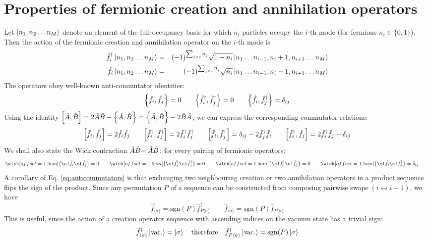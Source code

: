 \documentclass[12pt]{article}
\newcommand{\sgn}{\text{sgn}}
\newcommand{\seq}[1]{\langle #1\rangle}
\newcommand{\hc}{^\dagger}
\newcommand{\normord}[1]{:\mathrel{\mspace{2mu}#1\mspace{2mu}}:}
\begin{document}
	\section{Properties of fermionic creation and annihilation operators}
	
	Let $\ket{n_1,n_2\dots n_M}$ denote an element of the full-occupancy basis for which $n_i$ particles occupy the $i$-th mode (for fermions $n_i\in\{0,1\}$). Then the action of the fermionic creation and annihilation operator on the $i$-th mode is \cite[Eq. 3.47]{fermionic_definition}
	\begin{eqnarray}
	\hat{f}\hc_i\ket{n_1,n_2\dots n_M}&=&(-1)^{\sum_{j<i}n_j}\sqrt{1-n_i}\ket{n_1\dots n_{i-1}, n_i + 1, n_{i+1}\dots n_M}\\
	\hat{f}_i\ket{n_1,n_2\dots n_M}&=&(-1)^{\sum_{j<i}n_j}\sqrt{n_i}\ket{n_1\dots n_{i-1}, n_i - 1, n_{i+1}\dots n_M}
	\end{eqnarray}
	The operators obey well-known anti-commutator identities:
	\begin{equation}\label{eq:anticommutators}
	\acomm{\hat{f}_i}{\hat{f}_j}=0\qquad\acomm{\hat{f}\hc_i}{\hat{f}\hc_j}=0\qquad\acomm{\hat{f}_i}{\hat{f}\hc_j}=\delta_{ij}
	\end{equation}
	Using the identity $\comm{\hat{A}}{\hat{B}}=2\hat{A}\hat{B}-\acomm{\hat{A}}{\hat{B}}=\acomm{\hat{A}}{\hat{B}}-2\hat{B}\hat{A}$, we can express the corresponding commutator relations:
	\begin{equation}\label{eq:commutators}
	\comm{\hat{f}_i}{\hat{f}_j}=2\hat{f}_i\hat{f}_j\qquad\comm{\hat{f}\hc_i}{\hat{f}\hc_j}=2\hat{f}\hc_i\hat{f}\hc_j\qquad\comm{\hat{f}_i}{\hat{f}\hc_j}=\delta_{ij}-2\hat{f}\hc_j\hat{f}_i\qquad \comm{\hat{f}\hc_i}{\hat{f}_j}=2\hat{f}\hc_i\hat{f}_j-\delta_{ij}
	\end{equation}
	We shall also state the Wick contraction $\hat{A}\hat{B}-\mkern-7mu\normord{\hat{A}\hat{B}}$ for every pairing of fermionic operators:
	\begin{equation}\label{eq:contractions}
	    \wick[offset=1.5em]{\c1{\hat{f}_i} \c1{\hat{f}_j}}=0\qquad\wick[offset=1.5em]{\c1{\hat{f}\hc_i} \c1{\hat{f}\hc_j}}=0\qquad\wick[offset=1.5em]{\c1{\hat{f}\hc_i} \c1{\hat{f}_j}}=0\qquad\wick[offset=1.5em]{\c1{\hat{f}_i} \c1{\hat{f}\hc_j}}=\delta_{ij}\qquad
	\end{equation}
	A corollary of Eq. \ref{eq:anticommutators} is that exchanging two neighbouring creation or two annihilation operators in a product sequence flips the sign of the product. Since any permutation $P$ of a sequence can be constructed from composing pairwise swaps $(i\leftrightarrow i+1)$, we have
	\begin{equation}\label{eq:permutation of sequence}
	\hat{f}\hc_{\seq{\sigma}}=\sgn(P)\hat{f}\hc_{P\seq{\sigma}}\qquad\hat{f}_{\seq{\sigma}}=\sgn(P)\hat{f}_{P\seq{\sigma}}
	\end{equation}
	This is useful, since the action of a creation operator sequence with ascending indices on the vacuum state has a trivial sign:
	\begin{equation}\label{eq:ascending creation on vacuum}
	\hat{f}\hc_{\seq{\sigma}}\ket{\rm vac.}=\ket{\sigma}\qq{therefore}\hat{f}\hc_{P\seq{\sigma}}\ket{\rm vac.}=\sgn(P)\ket{\sigma}
	\end{equation}
	
\end{document}

